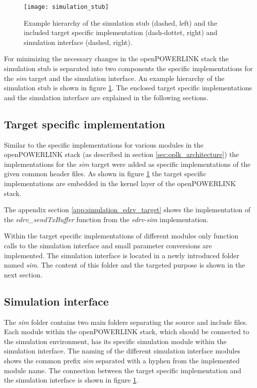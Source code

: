 \begin{figure}
    \centering
    \texttt{[image: simulation\_stub]}
    \caption{Example hierarchy of the simulation stub (dashed, left) and the included target specific implementation (dash-dottet, right) and simulation interface (dashed, right).}
    \label{fig:simulation_stub}
\end{figure}

For minimizing the necessary changes in the openPOWERLINK stack the simulation stub is separated into two components the specific implementations for the \emph{sim} target and the simulation interface.
An example hierarchy of the simulation stub is shown in figure \ref{fig:simulation_stub}.
The enclosed target specific implementations and the simulation interface are explained in the following sections.

\subsection{Target specific implementation}
\label{sec:porting_simstub_target}

Similar to the specific implementations for various modules in the openPOWERLINK stack (as described in section \ref{sec:oplk_architecture}) the implementations for the \emph{sim} target were added as specific implementations of the given common header files.
As shown in figure \ref{fig:simulation_stub} the target specific implementations are embedded in the kernel layer of the openPOWERLINK stack.

\begin{sloppypar}
The appendix section \ref{app:simulation_edrv_target} shows the implementation of the \emph{edrv\_sendTxBuffer} function from the \emph{edrv-sim} implementation.
\end{sloppypar}

Within the target specific implementations of different modules only function calls to the simulation interface and small parameter conversions are implemented.
The simulation interface is located in a newly introduced folder named \emph{sim}.
The content of this folder and the targeted purpose is shown in the next section.

\subsection{Simulation interface}
\label{sec:porting_simstub_siminterface}
The \emph{sim} folder contains two main folders separating the source and include files.
Each module within the openPOWERLINK stack, which should be connected to the simulation environment, has its specific simulation module within the simulation interface.
The naming of the different simulation interface modules shows the common prefix \emph{sim} separated with a hyphen from the implemented module name.
The connection between the target specific implementation and the simulation interface is shown in figure \ref{fig:simulation_stub}. 

